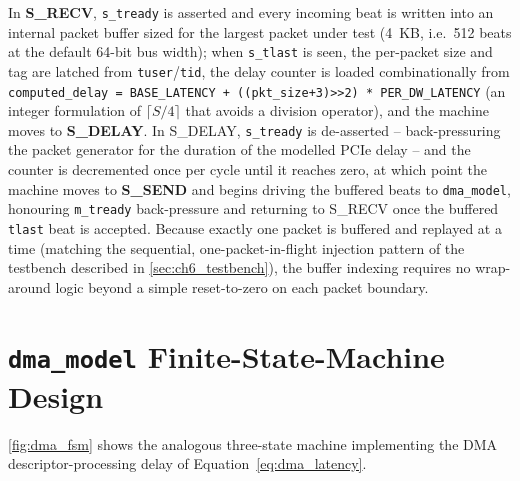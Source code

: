 In \textbf{S\_RECV}, \texttt{s\_tready} is asserted and every incoming beat is written into an internal packet buffer sized for the largest packet under test (4~KB, i.e.\ 512 beats at the default 64-bit bus width); when \texttt{s\_tlast} is seen, the per-packet size and tag are latched from \texttt{tuser}/\texttt{tid}, the delay counter is loaded combinationally from \texttt{computed\_delay = BASE\_LATENCY + ((pkt\_size+3)>>2) * PER\_DW\_LATENCY} (an integer formulation of $\lceil S/4\rceil$ that avoids a division operator), and the machine moves to \textbf{S\_DELAY}. In S\_DELAY, \texttt{s\_tready} is de-asserted -- back-pressuring the packet generator for the duration of the modelled PCIe delay -- and the counter is decremented once per cycle until it reaches zero, at which point the machine moves to \textbf{S\_SEND} and begins driving the buffered beats to \texttt{dma\_model}, honouring \texttt{m\_tready} back-pressure and returning to S\_RECV once the buffered \texttt{tlast} beat is accepted. Because exactly one packet is buffered and replayed at a time (matching the sequential, one-packet-in-flight injection pattern of the testbench described in \autoref{sec:ch6_testbench}), the buffer indexing requires no wrap-around logic beyond a simple reset-to-zero on each packet boundary.


\section{\texttt{dma\_model} Finite-State-Machine Design}
\label{sec:ch5_dma_fsm}

\autoref{fig:dma_fsm} shows the analogous three-state machine implementing the DMA descriptor-processing delay of Equation~\ref{eq:dma_latency}.


